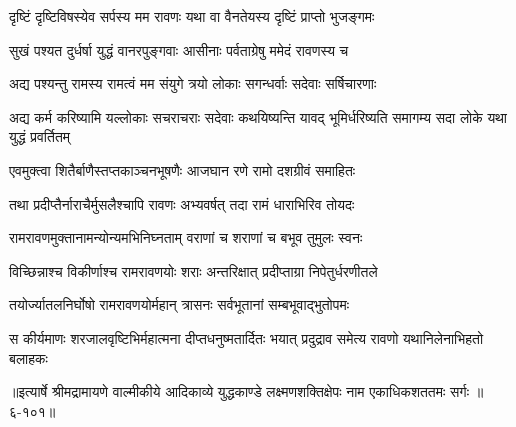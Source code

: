 \twolineshloka
{दृष्टिं दृष्टिविषस्येव सर्पस्य मम रावणः}
{यथा वा वैनतेयस्य दृष्टिं प्राप्तो भुजङ्गमः} %

\twolineshloka
{सुखं पश्यत दुर्धर्षा युद्धं वानरपुङ्गवाः}
{आसीनाः पर्वताग्रेषु ममेदं रावणस्य च} %

\twolineshloka
{अद्य पश्यन्तु रामस्य रामत्वं मम संयुगे}
{त्रयो लोकाः सगन्धर्वाः सदेवाः सर्षिचारणाः} %

\threelineshloka
{अद्य कर्म करिष्यामि यल्लोकाः सचराचराः}
{सदेवाः कथयिष्यन्ति यावद् भूमिर्धरिष्यति}
{समागम्य सदा लोके यथा युद्धं प्रवर्तितम्} %

\twolineshloka
{एवमुक्त्वा शितैर्बाणैस्तप्तकाञ्चनभूषणैः}
{आजघान रणे रामो दशग्रीवं समाहितः} %

\twolineshloka
{तथा प्रदीप्तैर्नाराचैर्मुसलैश्चापि रावणः}
{अभ्यवर्षत् तदा रामं धाराभिरिव तोयदः} %

\twolineshloka
{रामरावणमुक्तानामन्योन्यमभिनिघ्नताम्}
{वराणां च शराणां च बभूव तुमुलः स्वनः} %

\twolineshloka
{विच्छिन्नाश्च विकीर्णाश्च रामरावणयोः शराः}
{अन्तरिक्षात् प्रदीप्ताग्रा निपेतुर्धरणीतले} %

\twolineshloka
{तयोर्ज्यातलनिर्घोषो रामरावणयोर्महान्}
{त्रासनः सर्वभूतानां सम्बभूवाद्भुतोपमः} %

\twolineshloka
{स कीर्यमाणः शरजालवृष्टिभिर्महात्मना दीप्तधनुष्मतार्दितः}
{भयात् प्रदुद्राव समेत्य रावणो यथानिलेनाभिहतो बलाहकः} %


॥इत्यार्षे श्रीमद्रामायणे वाल्मीकीये आदिकाव्ये युद्धकाण्डे लक्ष्मणशक्तिक्षेपः नाम एकाधिकशततमः सर्गः ॥६-१०१॥
